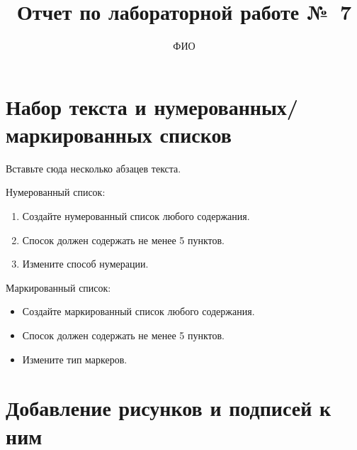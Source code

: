 \documentclass{article} %
\title{Отчет по лабораторной работе №~7}
\author{ФИО} %
\date{ }
\begin{document}
\maketitle %

\tableofcontents %

\newpage

\section{Набор текста и нумерованных/маркированных списков}

Вставьте сюда несколько абзацев текста.

Нумерованный список:
\begin{enumerate} %
  \item Создайте нумерованный список любого содержания.
  \item Спосок должен содержать не менее 5 пунктов.
  \item Измените способ нумерации.
\end{enumerate}

Маркированный список:
\begin{itemize}%
  \item Создайте маркированный список любого содержания.
  \item Спосок должен содержать не менее 5 пунктов.
  \item Измените тип маркеров.
\end{itemize}

\section{Добавление рисунков и подписей к ним}

\end{document}

